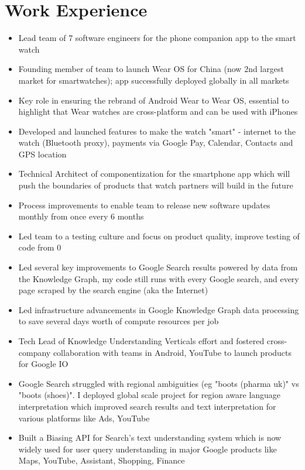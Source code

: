 \documentclass[11pt,a4paper]{moderncv}
\begin{document}
\makecvtitle

\section{Work Experience}
{\begin{itemize}
        \item Lead team of 7 software engineers for the phone companion app to the
smart watch
        \item  Founding member of team to launch Wear OS for China (now 2nd largest
market for smartwatches); app successfully deployed globally in all markets
        \item Key role in ensuring the rebrand of Android Wear to Wear OS, essential to
highlight that Wear watches are cross-platform and can be used with iPhones
        \item Developed and launched features to make the watch "smart" - internet to
the watch (Bluetooth proxy), payments via Google Pay, Calendar, Contacts
and GPS location
        \item Technical Architect of componentization for the smartphone app which will
  push the boundaries of products that watch partners will build in the future
        \item Process improvements to enable team to release new software updates
          monthly from once every 6 months
        \item Led team to a testing culture and focus on product quality, improve testing
of code from 0%
\end{itemize}}
{\begin{itemize}
        \item Led several key improvements to Google Search results powered by data from the Knowledge Graph, my code still runs with every Google search, and every page scraped by the search engine (aka the Internet)
        \item Led infrastructure advancements in Google Knowledge Graph data processing to save several days worth of compute resources per job
        \item Tech Lead of Knowledge Understanding Verticals effort and fostered cross-company collaboration with teams in Android, YouTube to launch products for Google IO
        \item Google Search struggled with regional ambiguities (eg "boots (pharma uk)" vs "boots (shoes)". I deployed global scale project for region aware language interpretation which improved search results and text interpretation for various platforms like Ads, YouTube
        \item Built a Biasing API for Search's text understanding system which is now widely used for user query understanding in major Google products like Maps, YouTube, Assistant, Shopping, Finance
 \end{itemize}}
\end{document}
